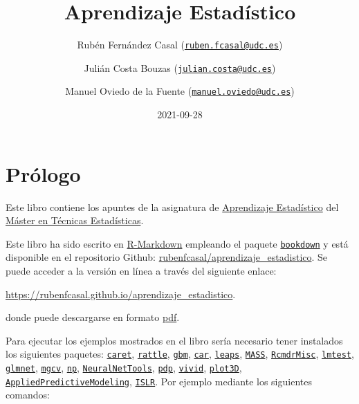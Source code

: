 \documentclass[
  spanish,
]{book}
\title{Aprendizaje Estadístico}
\author{Rubén Fernández Casal (\href{mailto:ruben.fcasal@udc.es}{\nolinkurl{ruben.fcasal@udc.es}}) \and Julián Costa Bouzas (\href{mailto:julian.costa@udc.es}{\nolinkurl{julian.costa@udc.es}}) \and Manuel Oviedo de la Fuente (\href{mailto:manuel.oviedo@udc.es}{\nolinkurl{manuel.oviedo@udc.es}})}
\date{2021-09-28}
\theoremstyle{break}
\theoremstyle{definition}
\theoremstyle{definition}
\theoremstyle{definition}
\theoremstyle{remark}
\begin{document}
\maketitle

{
\setcounter{tocdepth}{1}
\tableofcontents
}
\hypertarget{pruxf3logo}{%
\chapter*{Prólogo}\label{pruxf3logo}}

Este libro contiene los apuntes de la asignatura de \href{http://eamo.usc.es/pub/mte/index.php?option=com_content\&view=article\&id=74}{Aprendizaje Estadístico} del \href{http://eio.usc.es/pub/mte}{Máster en Técnicas Estadísticas}.

Este libro ha sido escrito en \href{http://rmarkdown.rstudio.com}{R-Markdown} empleando el paquete \href{https://bookdown.org/yihui/bookdown/}{\texttt{bookdown}} y está disponible en el repositorio Github: \href{https://github.com/rubenfcasal/aprendizaje_estadistico}{rubenfcasal/aprendizaje\_estadistico}.
Se puede acceder a la versión en línea a través del siguiente enlace:

\url{https://rubenfcasal.github.io/aprendizaje_estadistico}.

donde puede descargarse en formato \href{https://rubenfcasal.github.io/aprendizaje_estadistico/aprendizaje_estadistico.pdf}{pdf}.

Para ejecutar los ejemplos mostrados en el libro sería necesario tener instalados los siguientes paquetes:
\href{https://CRAN.R-project.org/package=caret}{\texttt{caret}}, \href{https://CRAN.R-project.org/package=rattle}{\texttt{rattle}}, \href{https://CRAN.R-project.org/package=gbm}{\texttt{gbm}}, \href{https://CRAN.R-project.org/package=car}{\texttt{car}}, \href{https://CRAN.R-project.org/package=leaps}{\texttt{leaps}}, \href{https://CRAN.R-project.org/package=MASS}{\texttt{MASS}}, \href{https://CRAN.R-project.org/package=RcmdrMisc}{\texttt{RcmdrMisc}}, \href{https://CRAN.R-project.org/package=lmtest}{\texttt{lmtest}}, \href{https://CRAN.R-project.org/package=glmnet}{\texttt{glmnet}}, \href{https://CRAN.R-project.org/package=mgcv}{\texttt{mgcv}}, \href{https://CRAN.R-project.org/package=np}{\texttt{np}}, \href{https://CRAN.R-project.org/package=NeuralNetTools}{\texttt{NeuralNetTools}}, \href{https://CRAN.R-project.org/package=pdp}{\texttt{pdp}}, \href{https://CRAN.R-project.org/package=vivid}{\texttt{vivid}}, \href{https://CRAN.R-project.org/package=plot3D}{\texttt{plot3D}}, \href{https://CRAN.R-project.org/package=AppliedPredictiveModeling}{\texttt{AppliedPredictiveModeling}}, \href{https://CRAN.R-project.org/package=ISLR}{\texttt{ISLR}}.
Por ejemplo mediante los siguientes comandos:
\end{document}
